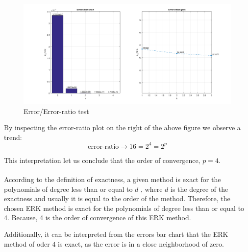 \documentclass[a4paper]{article}
\begin{document}
\begin{figure}[!ht]
\centering
\includegraphics[width=1\textwidth]{testeer.png}
\caption{Error/Error-ratio test}
\label{fig:testeer}
\end{figure}

By inspecting the error-ratio plot on the right of the above figure we observe a trend:  $$\textrm{error-ratio}\rightarrow 16 = 2^4 = 2^p$$

This interpretation let us conclude that the order of convergence, $p=4$.\\\\
According to the definition of exactness, a given method is exact for the polynomials of degree less than or equal to $d$ , where $d$ is the degree of the exactness and usually it is equal to the order of the method. Therefore, the chosen ERK method is exact for the polynomials of degree less than or equal to 4. Because, 4 is the order of convergence of this ERK method.

Additionally, it can be interpreted from the errors bar chart that the ERK method of oder 4 is exact, as the error is in a close neighborhood of zero. 
\end{document}
